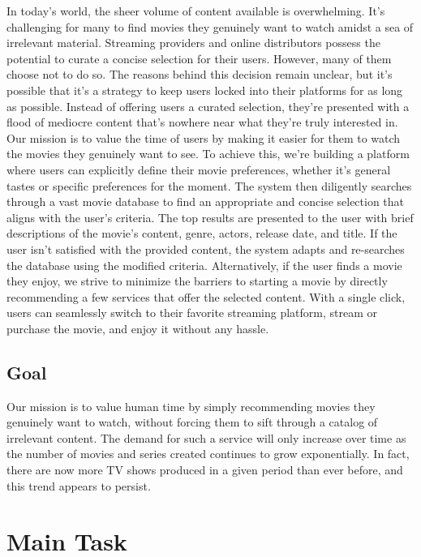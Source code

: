 \documentclass[11pt,a4paper]{article}
\begin{document}
  In today’s world, the sheer volume of content available is overwhelming.
  It’s challenging for many to find movies they genuinely want to watch amidst a sea of irrelevant material.
  Streaming providers and online distributors possess the potential to curate a concise selection for their users.
  However, many of them choose not to do so.
  The reasons behind this decision remain unclear, but it’s possible that it’s a strategy to keep users locked into their platforms for as long as possible.
  Instead of offering users a curated selection, they’re presented with a flood of mediocre content that’s nowhere near what they’re truly interested in.
  Our mission is to value the time of users by making it easier for them to watch the movies they genuinely want to see.
  To achieve this, we’re building a platform where users can explicitly define their movie preferences, whether it’s general tastes or specific preferences for the moment.
  The system then diligently searches through a vast movie database to find an appropriate and concise selection that aligns with the user’s criteria.
  The top results are presented to the user with brief descriptions of the movie’s content, genre, actors, release date, and title.
  If the user isn’t satisfied with the provided content, the system adapts and re-searches the database using the modified criteria.
  Alternatively, if the user finds a movie they enjoy, we strive to minimize the barriers to starting a movie by directly recommending a few services that offer the selected content.
  With a single click, users can seamlessly switch to their favorite streaming platform, stream or purchase the movie, and enjoy it without any hassle.

  \subsection{Goal}
  Our mission is to value human time by simply recommending movies they genuinely want to watch, without forcing them to sift through a catalog of irrelevant content.
  The demand for such a service will only increase over time as the number of movies and series created continues to grow exponentially.
  In fact, there are now more TV shows produced in a given period than ever before, and this trend appears to persist.

  \section{Main Task}
\end{document}

